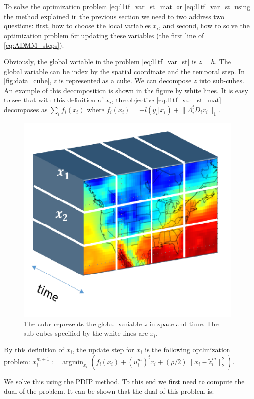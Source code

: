 \documentclass{article}
\DeclareMathOperator*{\argmin}{argmin}
\begin{document}
To solve the optimization problem \eqref{eq:l1tf_var_st_mat} or \eqref{eq:l1tf_var_st} using the method explained in the previous section we need to two address two questions: first, how to choose the local variables $x_i$, and second, how to solve the optimization problem for updating these variables (the first line of \eqref{eq:ADMM_steps}). 

Obviously, the global variable in the problem \eqref{eq:l1tf_var_st} is $z=h$. The global variable can be index by the spatial coordinate and the temporal step. In \autoref{fig:data_cube}, $z$ is represented as a cube. We can decompose $z$ into sub-cubes. An example of this decomposition is shown in the figure by white lines. It is easy to see that with this definition of $x_i$, the objective \eqref{eq:l1tf_var_st_mat} decomposes as $\sum_i f_i(x_i)$ where $f_i(x_i)=-l(y_i|x_i)+\lVert \Lambda_i^t D_ix_i \lVert_1$. 


\begin{figure}[tb]
	\vskip 0.2in
	\begin{center}
		\centerline{\includegraphics[width=.5\columnwidth]{Figures/data_cube}}
		\caption{The cube represents the global variable $z$ in space and time. The sub-cubes specified by the white lines are $x_i$.}
		\label{fig:data_cube}
	\end{center}
	\vskip -0.2in
\end{figure} 

By this definition of $x_i$, the update step for $x_i$ is the following optimization problem: $x_i^{m+1}:=\argmin_{x_i} ( f_i(x_i) + (u_i^m)^t x_i + (\rho/2) \lVert x_i-\tilde{z}_i^m \lVert_2^2)$.

We solve this using the PDIP method. To this end we first need to compute the dual of the problem. It can be shown that the dual of this problem is:

\end{document}
